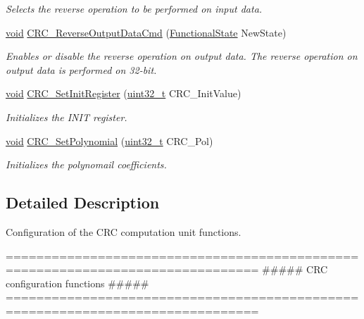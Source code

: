\begin{DoxyCompactItemize}
\begin{DoxyCompactList}\small\item\em Selects the reverse operation to be performed on input data. \end{DoxyCompactList}\item 
\hyperlink{group___n_a_m_e_ga18028b8badbf1ea7e704ccac3c488e82}{void} \hyperlink{group___c_r_c___group1_gae316179fde59ede10fd2d1bea870ca98}{C\-R\-C\-\_\-\-Reverse\-Output\-Data\-Cmd} (\hyperlink{group___exported__types_gac9a7e9a35d2513ec15c3b537aaa4fba1}{Functional\-State} New\-State)
\begin{DoxyCompactList}\small\item\em Enables or disable the reverse operation on output data. The reverse operation on output data is performed on 32-\/bit. \end{DoxyCompactList}\item 
\hyperlink{group___n_a_m_e_ga18028b8badbf1ea7e704ccac3c488e82}{void} \hyperlink{group___c_r_c___group1_gaebc9194004fc6a418debb54e21216051}{C\-R\-C\-\_\-\-Set\-Init\-Register} (\hyperlink{stdint_8h_a435d1572bf3f880d55459d9805097f62}{uint32\-\_\-t} C\-R\-C\-\_\-\-Init\-Value)
\begin{DoxyCompactList}\small\item\em Initializes the I\-N\-I\-T register. \end{DoxyCompactList}\item 
\hyperlink{group___n_a_m_e_ga18028b8badbf1ea7e704ccac3c488e82}{void} \hyperlink{group___c_r_c___group1_ga355f0857dec12918a2b93ca0549e2a9c}{C\-R\-C\-\_\-\-Set\-Polynomial} (\hyperlink{stdint_8h_a435d1572bf3f880d55459d9805097f62}{uint32\-\_\-t} C\-R\-C\-\_\-\-Pol)
\begin{DoxyCompactList}\small\item\em Initializes the polynomail coefficients. \end{DoxyCompactList}\end{DoxyCompactItemize}


\subsection{Detailed Description}
Configuration of the C\-R\-C computation unit functions. \begin{DoxyVerb} ===============================================================================
                  ##### CRC configuration functions #####
 ===============================================================================\end{DoxyVerb}
 

